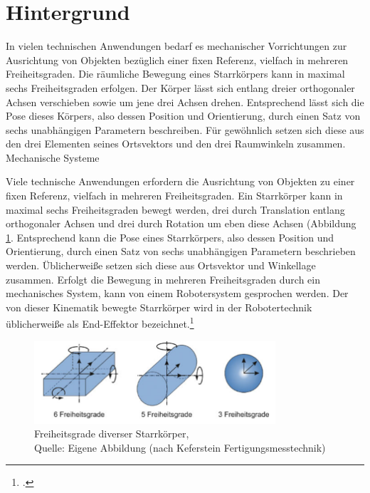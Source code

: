 \section{Hintergrund}

In vielen technischen Anwendungen bedarf es mechanischer Vorrichtungen zur Ausrichtung von Objekten bezüglich einer fixen Referenz, vielfach in mehreren Freiheitsgraden. Die räumliche Bewegung eines Starrkörpers kann in maximal sechs Freiheitsgraden erfolgen. Der Körper lässt sich entlang dreier orthogonaler Achsen verschieben sowie um jene drei Achsen drehen. Entsprechend lässt sich die Pose dieses Körpers, also dessen Position und Orientierung, durch einen Satz von sechs unabhängigen Parametern beschreiben. Für gewöhnlich setzen sich diese aus den drei Elementen seines Ortsvektors und den drei Raumwinkeln zusammen. Mechanische Systeme 

Viele technische Anwendungen erfordern die Ausrichtung von Objekten zu einer fixen Referenz, vielfach in mehreren Freiheitsgraden. Ein Starrkörper kann in maximal sechs Freiheitsgraden bewegt werden, drei durch Translation entlang orthogonaler Achsen und drei durch Rotation um eben diese Achsen (Abbildung \ref{fig:intro_freiheitsgrade}. Entsprechend kann die Pose eines Starrkörpers, also dessen Position und Orientierung, durch einen Satz von sechs unabhängigen Parametern beschrieben werden. Üblicherweiße setzen sich diese aus Ortsvektor und Winkellage zusammen. Erfolgt die Bewegung in mehreren Freiheitsgraden durch ein mechanisches System, kann von einem Robotersystem gesprochen werden. Der von dieser Kinematik bewegte Starrkörper wird in der Robotertechnik üblicherweiße als End-Effektor bezeichnet.\footcite[Vgl.][1]{Merlet2006}

\begin{figure}[H]
    \centering
    \includegraphics[width=0.8\textwidth]{graphics/intro/intro_freiheitsgrade}
    \caption[Freiheitsgrade diverser Starrkörper]{Freiheitsgrade diverser Starrkörper, \\Quelle: Eigene Abbildung (nach Keferstein Fertigungsmesstechnik)}
    \label{fig:intro_freiheitsgrade}
\end{figure}

